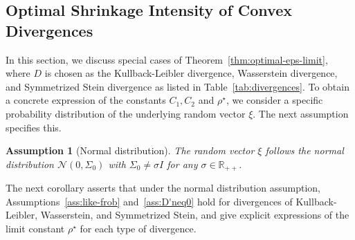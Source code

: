 \documentclass[11pt]{article}
\def\R{\mathbb{R}}
\newtheorem{assumption}{Assumption}
\newcommand{\opt}{^\star}
\def\R{\mathbb{R}}
\begin{document}
\subsection{Optimal Shrinkage Intensity of Convex Divergences}\label{sec:optimal-radius}

In this section, we discuss special cases of Theorem~\ref{thm:optimal-eps-limit}, where $D$ is chosen as the Kullback-Leibler divergence, Wasserstein divergence, and Symmetrized Stein divergence as listed in Table~\ref{tab:divergences}. To obtain a concrete expression of the constants $C_1,C_2$ and $ \rho\opt$, we consider a specific probability distribution of the underlying random vector $\xi$. The next assumption specifies this.

\begin{assumption}[Normal distribution]\label{ass:normal-distribution}
    The random vector $\xi$ follows the normal distribution $\mathcal{N}(0, \Sigma_0)$ with $\Sigma_0\neq \sigma I$ for any $\sigma \in \R_{++}$.
\end{assumption}

The next corollary asserts that under the normal distribution assumption, Assumptions~\ref{ass:like-frob} and~\ref{ass:D'neq0} hold for divergences of Kullback-Leibler, Wasserstein, and Symmetrized Stein, and give explicit expressions of the limit constant $ \rho\opt$ for each type of divergence.
\end{document}
